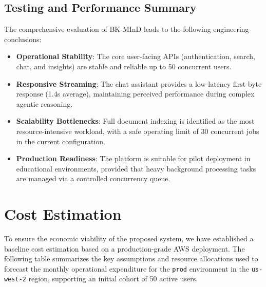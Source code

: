 \subsection{Testing and Performance Summary}

The comprehensive evaluation of BK-MInD leads to the following engineering conclusions:
\begin{itemize}
    \item \textbf{Operational Stability}: The core user-facing APIs (authentication, search, chat, and insights) are stable and reliable up to 50 concurrent users.
    \item \textbf{Responsive Streaming}: The chat assistant provides a low-latency first-byte response (1.4s average), maintaining perceived performance during complex agentic reasoning.
    \item \textbf{Scalability Bottlenecks}: Full document indexing is identified as the most resource-intensive workload, with a safe operating limit of 30 concurrent jobs in the current configuration.
    \item \textbf{Production Readiness}: The platform is suitable for pilot deployment in educational environments, provided that heavy background processing tasks are managed via a controlled concurrency queue.
\end{itemize}

\section{Cost Estimation}

To ensure the economic viability of the proposed system, we have established a baseline cost estimation based on a production-grade AWS deployment. The following table summarizes the key assumptions and resource allocations used to forecast the monthly operational expenditure for the \texttt{prod} environment in the \texttt{us-west-2} region, supporting an initial cohort of 50 active users.

